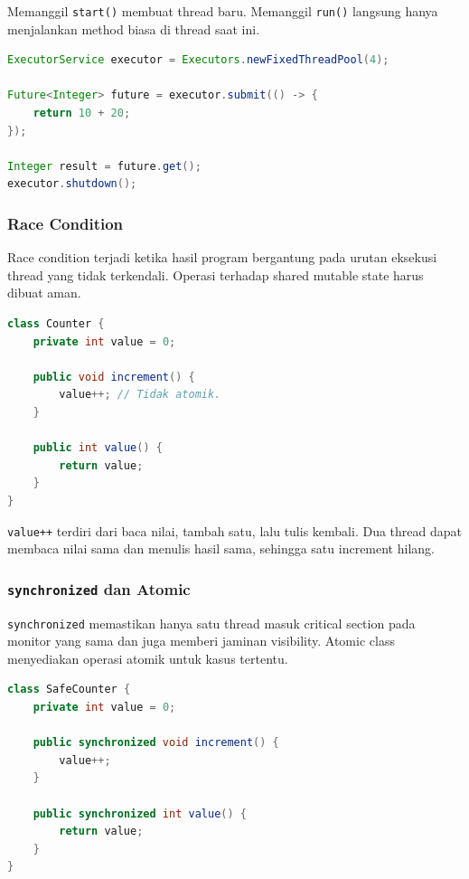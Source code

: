 Memanggil \texttt{start()} membuat thread baru. Memanggil \texttt{run()} langsung hanya menjalankan method biasa di thread saat ini.

\begin{lstlisting}[language=Java, caption={ExecutorService untuk menjalankan task}, label={lst:executor-service}]
ExecutorService executor = Executors.newFixedThreadPool(4);

Future<Integer> future = executor.submit(() -> {
    return 10 + 20;
});

Integer result = future.get();
executor.shutdown();
\end{lstlisting}

\subsubsection{Race Condition}

\begin{jawab}
Race condition terjadi ketika hasil program bergantung pada urutan eksekusi thread yang tidak terkendali. Operasi terhadap shared mutable state harus dibuat aman.
\end{jawab}

\begin{lstlisting}[language=Java, caption={Race condition pada increment}, label={lst:race-condition}]
class Counter {
    private int value = 0;

    public void increment() {
        value++; // Tidak atomik.
    }

    public int value() {
        return value;
    }
}
\end{lstlisting}

\texttt{value++} terdiri dari baca nilai, tambah satu, lalu tulis kembali. Dua thread dapat membaca nilai sama dan menulis hasil sama, sehingga satu increment hilang.

\subsubsection{\texttt{synchronized} dan Atomic}

\begin{jawab}
\texttt{synchronized} memastikan hanya satu thread masuk critical section pada monitor yang sama dan juga memberi jaminan visibility. Atomic class menyediakan operasi atomik untuk kasus tertentu.
\end{jawab}

\begin{lstlisting}[language=Java, caption={Counter thread-safe dengan synchronized}, label={lst:synchronized-counter}]
class SafeCounter {
    private int value = 0;

    public synchronized void increment() {
        value++;
    }

    public synchronized int value() {
        return value;
    }
}
\end{lstlisting}

